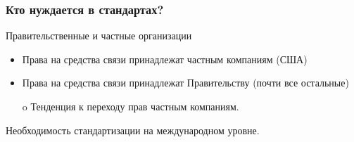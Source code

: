 \documentclass[utf8]{beamer}
\begin{document}
\begin{frame}
\frametitle{Кто нуждается в стандартах?}
\begin{block}{Правительственные и частные организации}
 \begin{itemize}
  \item Права на средства связи принадлежат частным компаниям (США)
  \item Права на средства связи принадлежат Правительству (почти все остальные)
 \end{itemize}
\end{block}
\begin{itemize}
 \item[o] Тенденция к переходу прав частным компаниям.
\end{itemize}
\Large
Необходимость стандартизации на международном уровне.
\end{frame}
\end{document}
